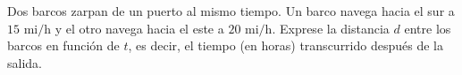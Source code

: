 \item Dos barcos zarpan de un puerto al mismo tiempo. Un barco navega hacia el sur a $15\text{ mi/h}$ y el otro navega hacia el este a $20\text{ mi/h}$. Exprese la distancia $d$ entre los barcos en función de $t$, es decir, el tiempo (en horas) transcurrido después de la salida.
